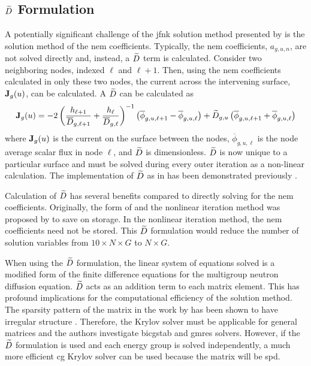   \subsection{\texorpdfstring{$\widetilde{D}$ Formulation}{D\textasciitilde \ Formulation}}
    \label{sec:dtilde_formulation}

    A potentially significant challenge of the \gls{jfnk} solution method
    presented by \citeauthor{qe2paper} is the solution method of the \gls{nem}
    coefficients. Typically, the \gls{nem} coefficients, $a_{g,u,n}$, are not
    solved directly and, instead, a $\widetilde{D}$ term is calculated. Consider two
    neighboring nodes, indexed $\ell$ and $\ell+1$. Then, using the \gls{nem}
    coefficients calculated in only these two nodes, the current across the
    intervening surface, $\mathbf{J}_g(u)$, can be calculated. A $\widetilde{D}$ can be
    calculated as
    \begin{equation}
      \label{eq:dtilde}
      \mathbf{J}_g(u) = 
        -2 \left( \frac{h_{\ell+1}}{\overline{D}_{g,\ell+1}} + 
          \frac{h_{\ell}}{\overline{D}_{g,\ell}} \right)^{-1}
          \left( \overline{\phi}_{g,u,\ell+1} -
          \overline{\phi}_{g,u,\ell} \right) + 
        \widetilde{D}_{g,u} \left( \overline{\phi}_{g,u,\ell+1} +
          \overline{\phi}_{g,u,\ell} \right)
    \end{equation}
    where $\mathbf{J}_g(u)$ is the current on the surface between the nodes,
    $\overline{\phi}_{g,u,\ell}$ is the node average scalar flux in node $\ell$,
    and $\widetilde{D}$ is dimensionless. $\widetilde{D}$ is now unique to a particular
    surface and must be solved during every outer iteration as a non-linear
    calculation. The implementation of $\widetilde{D}$ as in  has been
    demonstrated previously \cite{smith_nonlinear,palmtagThesis}.

    Calculation of $\widetilde{D}$ has several benefits compared to directly solving
    for the \gls{nem} coefficients. Originally, the form of  and
    the nonlinear iteration method was proposed by \citeauthor{smith_nonlinear}
    to save on storage. In the nonlinear iteration method, the \gls{nem}
    coefficients need not be stored. This $\widetilde{D}$ formulation would reduce the
    number of solution variables from $10 \times N \times G$ to $N \times G$.

    When using the $\widetilde{D}$ formulation, the linear system of equations solved
    is a modified form of the finite difference equations for the multigroup
    neutron diffusion equation. $\widetilde{D}$ acts as an addition term to each
    matrix element. This has profound implications for the computational
    efficiency of the solution method. The sparsity pattern of the matrix in the
    work by \citeauthor{qe2paper} has been shown to have irregular structure
    \cite{palmtagThesis}. Therefore, the Krylov solver must be applicable for
    general matrices and the authors investigate \gls{bicgstab} and \gls{gmres}
    solvers. However, if the $\widetilde{D}$ formulation is used and each energy group
    is solved independently, a much more efficient \gls{cg} Krylov solver can be
    used because the matrix will be \gls{spd}. 

